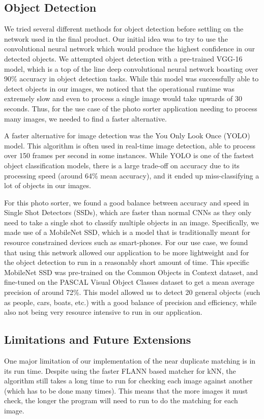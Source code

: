 \documentclass[12pt]{article}
\begin{document}
	
\subsection{Object Detection}
	We tried several different methods for object detection before settling on the network used in the final product. Our initial idea was to try to use the convolutional neural network which would produce the highest confidence in our detected objects. We attempted object detection with a pre-trained VGG-16 model, which is a top of the line deep convolutional neural network boasting over 90\% accuracy in object detection tasks. While this model was successfully able to detect objects in our images, we noticed that the operational runtime was extremely slow and even to process a single image would take upwards of 30 seconds. Thus, for the use case of the photo sorter application needing to process many images, we needed to find a faster alternative.
	
	A faster alternative for image detection was the You Only Look Once (YOLO) model. This algorithm is often used in real-time image detection, able to process over 150 frames per second in some instances. While YOLO is one of the fastest object classification models, there is a large trade-off on accuracy due to its processing speed (around 64\% mean accuracy), and it ended up miss-classifying a lot of objects in our images.
	
	For this photo sorter, we found a good balance between accuracy and speed in Single Shot Detectors (SSDs), which are faster than normal CNNs as they only need to take a single shot to classify multiple objects in an image. Specifically, we made use of a MobileNet SSD, which is a model that is traditionally meant for resource constrained devices such as smart-phones. For our use case, we found that using this network allowed our application to be more lightweight and for the object detection to run in a reasonably short amount of time. This specific MobileNet SSD was pre-trained on the Common Objects in Context dataset, and fine-tuned on the PASCAL Visual Object Classes dataset to get a mean average precision of around 72\%. This model allowed us to detect 20 general objects (such as people, cars, boats, etc.) with a good balance of precision and efficiency, while also not being very resource intensive to run in our application.
	

\subsection{Limitations and Future Extensions}
	One major limitation of our implementation of the near duplicate matching is in its run time. Despite using the faster FLANN based matcher for kNN, the algorithm still takes a long time to run for checking each image against another (which has to be done many times). This means that the more images it must check, the longer the program will need to run to do the matching for each image. 
	
\end{document}
